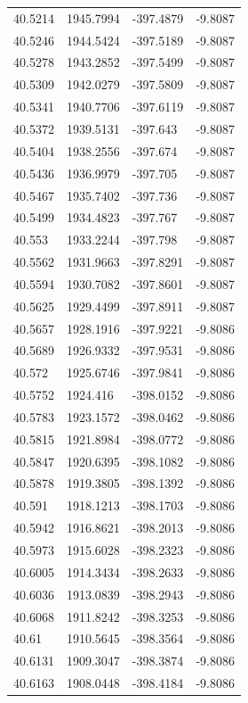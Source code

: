 \begin{table}[H]
\begin{tabular}{llll}
40.5214 & 1945.7994 & -397.4879 & -9.8087 \\
40.5246 & 1944.5424 & -397.5189 & -9.8087 \\
40.5278 & 1943.2852 & -397.5499 & -9.8087 \\
40.5309 & 1942.0279 & -397.5809 & -9.8087 \\
40.5341 & 1940.7706 & -397.6119 & -9.8087 \\
40.5372 & 1939.5131 & -397.643 & -9.8087 \\
40.5404 & 1938.2556 & -397.674 & -9.8087 \\
40.5436 & 1936.9979 & -397.705 & -9.8087 \\
40.5467 & 1935.7402 & -397.736 & -9.8087 \\
40.5499 & 1934.4823 & -397.767 & -9.8087 \\
40.553 & 1933.2244 & -397.798 & -9.8087 \\
40.5562 & 1931.9663 & -397.8291 & -9.8087 \\
40.5594 & 1930.7082 & -397.8601 & -9.8087 \\
40.5625 & 1929.4499 & -397.8911 & -9.8087 \\
40.5657 & 1928.1916 & -397.9221 & -9.8086 \\
40.5689 & 1926.9332 & -397.9531 & -9.8086 \\
40.572 & 1925.6746 & -397.9841 & -9.8086 \\
40.5752 & 1924.416 & -398.0152 & -9.8086 \\
40.5783 & 1923.1572 & -398.0462 & -9.8086 \\
40.5815 & 1921.8984 & -398.0772 & -9.8086 \\
40.5847 & 1920.6395 & -398.1082 & -9.8086 \\
40.5878 & 1919.3805 & -398.1392 & -9.8086 \\
40.591 & 1918.1213 & -398.1703 & -9.8086 \\
40.5942 & 1916.8621 & -398.2013 & -9.8086 \\
40.5973 & 1915.6028 & -398.2323 & -9.8086 \\
40.6005 & 1914.3434 & -398.2633 & -9.8086 \\
40.6036 & 1913.0839 & -398.2943 & -9.8086 \\
40.6068 & 1911.8242 & -398.3253 & -9.8086 \\
40.61 & 1910.5645 & -398.3564 & -9.8086 \\
40.6131 & 1909.3047 & -398.3874 & -9.8086 \\
40.6163 & 1908.0448 & -398.4184 & -9.8086 \\

\end{tabular}
\end{table}

